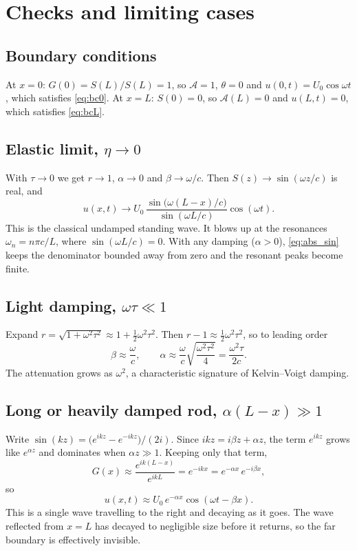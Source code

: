 \section{Checks and limiting cases}

\subsection{Boundary conditions}
At $x=0$: $G(0) = S(L)/S(L) = 1$, so $\mathcal{A}=1$, $\theta=0$ and
$u(0,t) = U_0\cos\omega t$, which satisfies \cref{eq:bc0}.
At $x=L$: $S(0) = 0$, so $\mathcal{A}(L)=0$ and $u(L,t)=0$, which satisfies \cref{eq:bcL}.

\subsection{Elastic limit, \texorpdfstring{$\eta \to 0$}{eta -> 0}}
With $\tau\to0$ we get $r\to1$, $\alpha\to0$ and $\beta\to\omega/c$. Then
$S(z)\to\sin(\omega z/c)$ is real, and
\begin{equation}
  u(x,t) \to U_0\,\frac{\sin\!\big(\omega(L-x)/c\big)}{\sin(\omega L/c)}\cos(\omega t).
\end{equation}
This is the classical undamped standing wave. It blows up at the resonances
$\omega_n = n\pi c/L$, where $\sin(\omega L/c) = 0$. With any damping
($\alpha>0$), \cref{eq:abs_sin} keeps the denominator bounded away from zero
and the resonant peaks become finite.

\subsection{Light damping, \texorpdfstring{$\omega\tau \ll 1$}{omega tau << 1}}
Expand $r = \sqrt{1+\omega^2\tau^2} \approx 1 + \tfrac12\omega^2\tau^2$. Then
$r - 1 \approx \tfrac12\omega^2\tau^2$, so to leading order
\begin{equation}
  \beta \approx \frac{\omega}{c}, \qquad
  \alpha \approx \frac{\omega}{c}\sqrt{\frac{\omega^2\tau^2}{4}} = \frac{\omega^2\tau}{2c}.
\end{equation}
The attenuation grows as $\omega^2$, a characteristic signature of
Kelvin--Voigt damping.

\subsection{Long or heavily damped rod, \texorpdfstring{$\alpha(L-x) \gg 1$}{alpha(L-x) >> 1}}
Write $\sin(kz) = \big(e^{ikz} - e^{-ikz}\big)/(2i)$. Since
$ikz = i\beta z + \alpha z$, the term $e^{ikz}$ grows like $e^{\alpha z}$ and
dominates when $\alpha z \gg 1$. Keeping only that term,
\begin{equation}
  G(x) \approx \frac{e^{ik(L-x)}}{e^{ikL}} = e^{-ikx} = e^{-\alpha x}\,e^{-i\beta x},
\end{equation}
so
\begin{equation}
  u(x,t) \approx U_0\, e^{-\alpha x}\cos(\omega t - \beta x).
\end{equation}
This is a single wave travelling to the right and decaying as it goes. The
wave reflected from $x = L$ has decayed to negligible size before it returns,
so the far boundary is effectively invisible.

